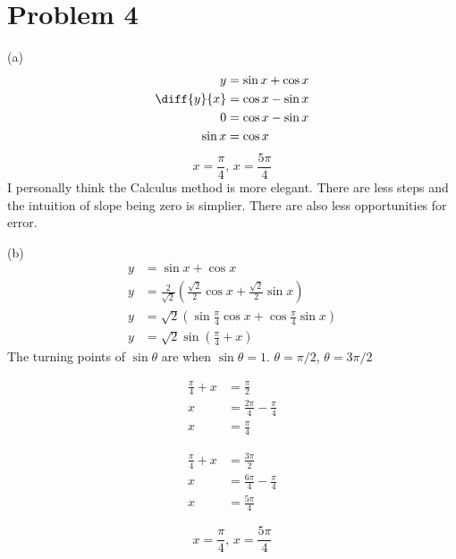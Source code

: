 \documentclass{article}
\begin{document}
\section*{Problem 4}
\begin{itemize}

\begin{minipage}[t]{.4\textwidth}
\item[(a)]
	\begin{align*}
		y&=\sin x+\cos x \\
		\diff{y}{x}&=\cos x-\sin x \\
		0&=\cos x-\sin x \\
		\sin x&=\cos x
	\end{align*}
	\[
		\boxed{x=\frac{\pi}{4},\,x=\frac{5\pi}{4}}
	\]
\flushleft
I personally think the Calculus method is more elegant. There
are less steps and the intuition of slope being zero is
simplier. There are also less opportunities for error.
\end{minipage}
\begin{minipage}[t]{.6\textwidth}
\item[(b)]
	\begin{align*}
		y&=\sin x+\cos x \\
		y&=\frac{2}{\sqrt{2}}\left(\frac{\sqrt{2}}{2}\cos x
			+\frac{\sqrt{2}}{2}\sin x\right) \\
		y&=\sqrt{2}\left(\sin\frac{\pi}{4}\cos x
			+\cos\frac{\pi}{4}\sin x\right) \\
		y&=\sqrt{2}\sin\left(\frac{\pi}{4}+x\right)
	\end{align*}
	\flushleft
	The turning points of $\sin\theta$ are when $\sin\theta=1$.
	$\theta=\pi/2$, $\theta=3\pi/2$
	\begin{minipage}[t]{.4\textwidth}
		\begin{align*}
			\frac{\pi}{4}+x&=\frac{\pi}{2} \\
			x&=\frac{2\pi}{4}-\frac{\pi}{4} \\
			x&=\frac{\pi}{4}
		\end{align*}
	\end{minipage}
	\begin{minipage}[t]{.4\textwidth}
		\begin{align*}
			\frac{\pi}{4}+x&=\frac{3\pi}{2} \\
			x&=\frac{6\pi}{4}-\frac{\pi}{4} \\
			x&=\frac{5\pi}{4}
		\end{align*}
	\end{minipage}
	\[
		\boxed{x=\frac{\pi}{4},\,x=\frac{5\pi}{4}}
	\]
\end{minipage}
\end{itemize}
\end{document}
